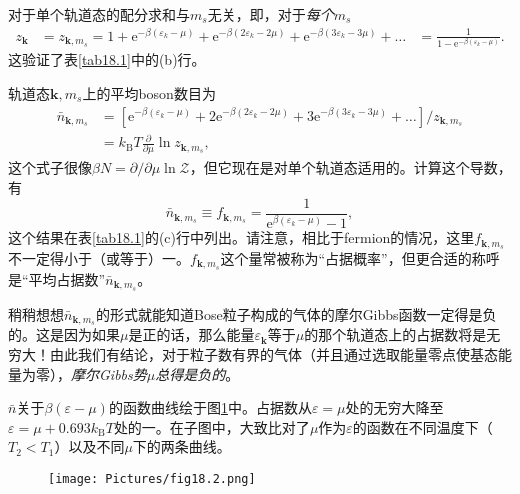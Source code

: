 对于单个轨道态的配分求和与$m_s$无关，即，对于{\it 每个}$m_s$
\begin{equation}
\begin{aligned}
z_{\mathbf k}&=z_{{\mathbf k},m_s}=1+\mathrm e^{-\beta(\varepsilon_k-\mu)}+\mathrm e^{-\beta(2\varepsilon_k-2\mu)}+\mathrm e^{-\beta(3\varepsilon_k-3\mu)}+\dots
&=\frac{1}{1-\mathrm e^{-\beta(\varepsilon_k-\mu)}}.
\end{aligned}
\label{equ18.47}
\end{equation}
这验证了表\ref{tab18.1}中的(b)行。

轨道态${\mathbf k},m_s$上的平均boson数目为
\begin{equation}
\begin{aligned}
\bar{n}_{{\mathbf k},m_s}&=\left[\mathrm e^{-\beta(\varepsilon_k-\mu)}+2\mathrm e^{-\beta(2\varepsilon_k-2\mu)}+3\mathrm e^{-\beta(3\varepsilon_k-3\mu)}+\dots\right]/z_{{\mathbf k},m_s} \\
&=k_\text{B}T\frac{\partial}{\partial\mu}\ln z_{\mathbf k,m_s},
\end{aligned}
\end{equation}
这个式子很像$\beta N=\partial/\partial\mu\ln\mathcal Z$，但它现在是对单个轨道态适用的。计算这个导数，有
\begin{equation}
\bar{n}_{{\mathbf k},m_s}\equiv f_{{{\mathbf k},m_s}}=\frac{1}{\mathrm e^{\beta(\varepsilon_k-\mu)}-1},
\end{equation}
这个结果在表\ref{tab18.1}的(c)行中列出。请注意，相比于fermion的情况，这里$f_{{\mathbf k},m_s}$不一定得小于（或等于）一。$f_{{\mathbf k},m_s}$这个量常被称为``占据概率''，但更合适的称呼是``平均占据数''$\bar{n}_{{\mathbf k},m_s}$。

稍稍想想$\bar{n}_{{\mathbf k},m_s}$的形式就能知道Bose粒子构成的气体的摩尔Gibbs函数一定得是负的。这是因为如果$\mu$是正的话，那么能量$\varepsilon_{\mathbf k}$等于$\mu$的那个轨道态上的占据数将是无穷大！由此我们有结论，对于粒子数有界的气体（并且通过选取能量零点使基态能量为零），{\it 摩尔Gibbs势$\mu$总得是负的}。

$\bar n$关于$\beta(\varepsilon-\mu)$的函数曲线绘于图\ref{fig18.2}中。占据数从$\varepsilon=\mu$处的无穷大降至$\varepsilon=\mu+0.693k_\text{B}T$处的一。在子图中，大致比对了$\mu$作为$\varepsilon$的函数在不同温度下（$T_2<T_1$）以及不同$\mu$下的两条曲线。

\begin{figure}[htbp]
\centering
\texttt{[image: Pictures/fig18.2.png]}
\label{fig18.2}
\end{figure}

